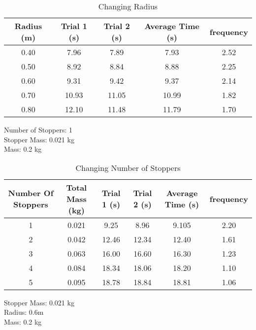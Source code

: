 \documentclass{article}[12pt]
\begin{document}
\begin{table}[H]
\centering
\caption{Changing Radius}
\begin{tabular}{c c c c c}
\hline\hline
Radius (m) & Trial 1 (s)&  Trial 2 (s) & Average Time (s)& frequency \\ [0.5ex] %
\hline
0.40&7.96&7.89&7.93&2.52 \\
0.50&8.92&8.84&8.88&2.25 \\
0.60&9.31&9.42&9.37&2.14 \\
0.70 &10.93 &11.05& 10.99 & 1.82 \\
0.80 &12.10&11.48& 11.79 & 1.70 \\ [1ex]
\hline
\end{tabular}
\label{table:massChange}

\end{table}
\begin{tcolorbox}[title=\begin{center}Table 2: Constants\end{center}]
\centering
Number of Stoppers: 1\\
Stopper Mass: 0.021 kg\\
Mass: 0.2 kg

\end{tcolorbox}
\begin{table}[H]
\centering
\caption{Changing Number of Stoppers}
\begin{tabular}{c c c c c c}
\hline\hline
Number Of Stoppers&Total Mass (kg)& Trial 1 (s)&  Trial 2 (s) & Average Time (s)& frequency \\ [0.5ex] 
\hline
1&0.021&9.25&8.96&9.105&2.20 \\
2&0.042&12.46&12.34&12.40&1.61 \\
3&0.063&16.00&16.60&16.30 &1.23\\
4&0.084&18.34&18.06&18.20 &1.10\\
5&0.095&18.78&18.84& 18.81 &1.06\\ [1ex]
\hline
\end{tabular}
\label{table:massChange}

\end{table}
\begin{tcolorbox}[title=\begin{center}Table 3: Constants\end{center}]
\centering
Stopper Mass: 0.021 kg\\
Radius: 0.6m\\
Mass: 0.2 kg\\
\end{tcolorbox}
\end{document}
